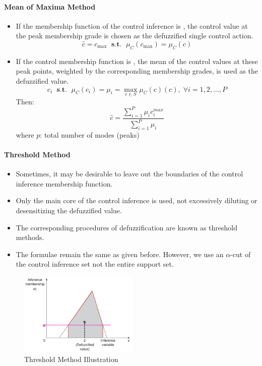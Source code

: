 \documentclass{tron}
\begin{document}
\paragraph{Mean of Maxima Method}
\begin{itemize}
	\item If the membership function of the control inference is , the control value at the peak membership grade is chosen as the defuzzified single control action.
	\begin{equation}
		\hat{c} = c_{\max} \;\textbf{ s.t. }\; \mu_C(c_{\max}) = \mu_C(c)
	\end{equation}
	\item If the control membership function is , the mean of the control values at these peak points, weighted by the corresponding membership grades, is used as the defuzzified value.
	\begin{equation}
		c_i \;\textbf{ s.t. }\; \mu_C(c_i) = \mu_i = \max_{c\in S} \mu_C(c)(c), \; \forall i = 1, 2, \dots, P
	\end{equation}
	Then:
	\begin{equation}
		\hat{c} = \frac{\sum_{i=1}^P \mu_i c_i^{max}}{\sum_{i=1}^P \mu_i} 
	\end{equation}
	where $p$: total number of modes (peaks)
\end{itemize}
\paragraph{Threshold Method}
\begin{itemize}
	\item Sometimes, it may be desirable to leave out the boundaries of the control inference membership function.
	\item Only the main core of the control inference is used, not excessively diluting or desensitizing the defuzzified value.
	\item The corresponding procedures of defuzzification are known as threshold methods.
	\item The formulae remain the same as given before. However, we use an $\alpha$-cut of the control inference set not the entire support set.
\end{itemize}
\begin{figure}[H]
	\centering
	\includegraphics[height=150px]{Figs/FuzzyInferencing/threshold-method}
	\caption{Threshold Method Illustration}
	\label{fig:fuzzy-inf:thresholdd}
\end{figure}
\end{document}
